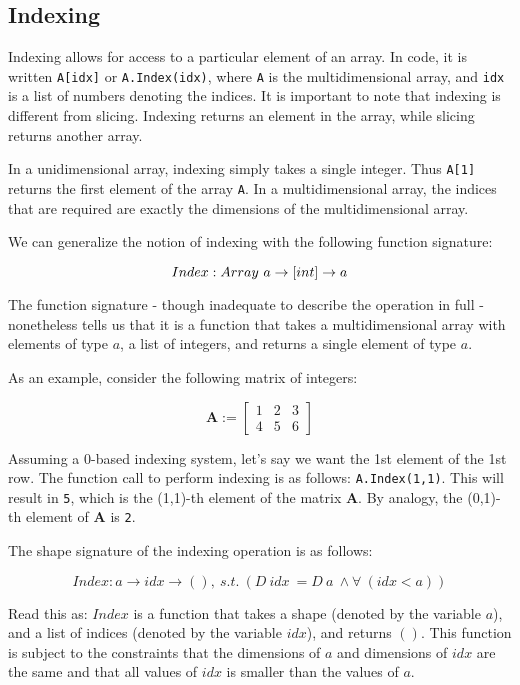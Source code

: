 \documentclass{article}
\begin{document}
\subsection{Indexing}

Indexing allows for access to a particular element of an array. In code, it is written \texttt{A[idx]} or \texttt{A.Index(idx)}, where \texttt{A} is the multidimensional array, and \texttt{idx} is a list of numbers denoting the indices. It is important to note that indexing is different from slicing. Indexing returns an element in the array, while slicing returns another array.

In a unidimensional array, indexing simply takes a single integer. Thus \texttt{A[1]} returns the first element of the array \texttt{A}. In a multidimensional array, the indices that are required are exactly the dimensions of the multidimensional array.

We can generalize the notion of indexing with the following function signature:

$$
Index : Array \ a \rightarrow [int] \rightarrow a\\
$$

The function signature - though inadequate to describe the operation in full -  nonetheless tells us that it is a function that takes a multidimensional array with elements of type $a$, a list of integers, and returns a single element of type $a$.

As an example, consider the following matrix of integers:

\begin{equation*}
  \mathbf{A} :=
\begin{bmatrix}
  1 & 2 & 3\\
  4 & 5 & 6
\end{bmatrix}
\end{equation*}

Assuming a 0-based indexing system, let's say we want the 1st element of the 1st row. The function call to perform indexing is as follows: \texttt{A.Index(1,1)}. This will result in \texttt{5}, which is the (1,1)-th element of the matrix $\mathbf{A}$. By analogy, the (0,1)-th element of $\mathbf{A}$ is \texttt{2}.

The shape signature of the indexing operation is as follows:

$$
Index: a \rightarrow idx \rightarrow () ,\ s.t.\ (D\ idx\ = D\ a\ \wedge \forall\ (idx < a))
$$

Read this as: $Index$ is a function that takes a shape (denoted by the variable $a$), and a list of indices (denoted by the variable $idx$), and returns $()$. This function is subject to the constraints that the dimensions of $a$ and dimensions of $idx$ are the same and that all values of $idx$ is smaller than the values of $a$.
\end{document}
